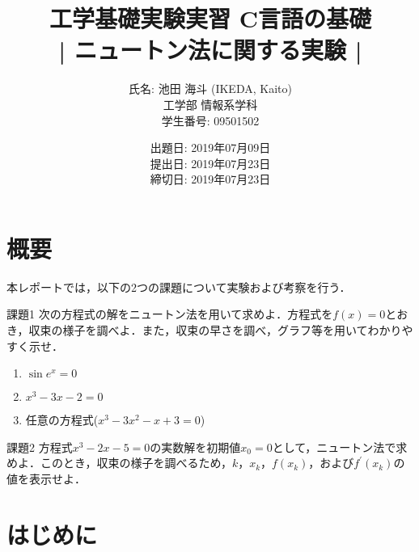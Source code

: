 \documentclass[12pt]{jarticle}
\begin{document}
\title{工学基礎実験実習 C言語の基礎 \\ | ニュートン法に関する実験 |}

\date{出題日: 2019年07月09日 \\
      提出日: 2019年07月23日 \\
      締切日: 2019年07月23日 \\}

\author{氏名: 池田 海斗 (IKEDA, Kaito) \\
        工学部 情報系学科 \\
        学生番号: 09501502}

\maketitle



\section{概要}

本レポートでは，以下の2つの課題について実験および考察を行う．

\begin{description}
\item 課題1
次の方程式の解をニュートン法を用いて求めよ．方程式を$f(x)=0$とおき，収束の様子を調べよ．また，収束の早さを調べ，グラフ等を用いてわかりやすく示せ．

\begin{enumerate}
\item $\sin e^x=0$
\item $x^3-3x-2=0$
\item 任意の方程式($x^3-3x^2-x+3=0$)
\end{enumerate}

\item 課題2
方程式$x^3-2x-5=0$の実数解を初期値$x_0=0$として，ニュートン法で求めよ．このとき，収束の様子を調べるため，$k$，$x_k$，$f(x_k)$，および$f^{\prime}(x_k)$の値を表示せよ．
\end{description}



\section{はじめに}
\end{document}
